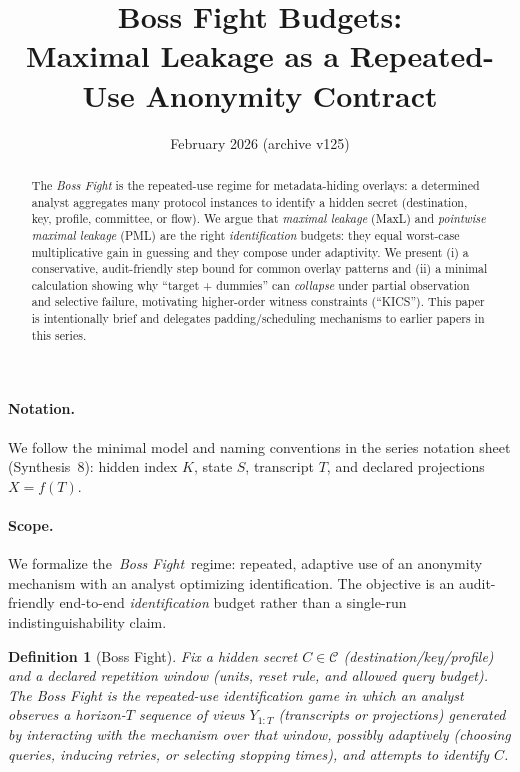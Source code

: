 \documentclass[11pt]{article}
\title{Boss Fight Budgets:\\ Maximal Leakage as a Repeated-Use Anonymity Contract}
\author{}
\date{February 2026 (archive v125)}
\newcommand{\C}{\mathcal{C}} %
\newtheorem{definition}{Definition}
\begin{document}
\maketitle

\begin{abstract}
The \emph{Boss Fight} is the repeated-use regime for metadata-hiding overlays: a determined analyst aggregates many protocol instances to identify a hidden secret (destination, key, profile, committee, or flow).
We argue that \emph{maximal leakage} (MaxL) and \emph{pointwise maximal leakage} (PML) are the right \emph{identification} budgets: they equal worst-case multiplicative gain in guessing and they compose under adaptivity.
We present (i) a conservative, audit-friendly step bound for common overlay patterns and (ii) a minimal calculation showing why ``target + dummies'' can \emph{collapse} under partial observation and selective failure, motivating higher-order witness constraints (``KICS'').
This paper is intentionally brief and delegates padding/scheduling mechanisms to earlier papers in this series.
\end{abstract}

\paragraph{Notation.}
We follow the minimal model and naming conventions in the series notation sheet (Synthesis~8): hidden index $K$, state $S$, transcript $T$, and declared projections $X=f(T)$.\cite{series:notation}

\paragraph{Scope.}
We formalize the \,\emph{Boss Fight}\, regime: repeated, adaptive use of an anonymity mechanism with an analyst optimizing identification.
The objective is an audit-friendly end-to-end \emph{identification} budget rather than a single-run indistinguishability claim.



\begin{definition}[Boss Fight]\label{def:bossfight}
Fix a hidden secret $C\in\C$ (destination/key/profile) and a declared repetition window (units, reset rule, and allowed query budget).
The \emph{Boss Fight} is the repeated-use identification game in which an analyst observes a horizon-$T$ sequence of views $Y_{1:T}$ (transcripts or projections) generated by interacting with the mechanism over that window, possibly adaptively (choosing queries, inducing retries, or selecting stopping times), and attempts to identify $C$.
\end{definition}
\end{document}
